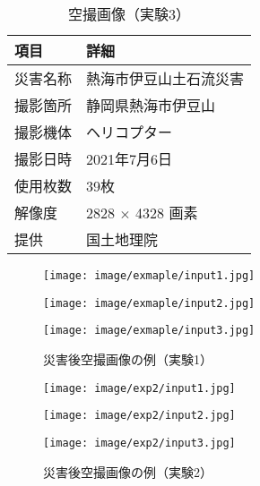       \begin{table}[tbp]
        \centering
        \caption{空撮画像（実験3）}
        \label{空撮画像（実験3）}
        \begin{tabular}{ll}
          \hline
          \textbf{項目} & \textbf{詳細} \\
          \hline \hline
          災害名称 & 熱海市伊豆山土石流災害 \\
          撮影箇所 & 静岡県熱海市伊豆山 \\
          撮影機体 & ヘリコプター \\
          撮影日時 & 2021年7月6日 \\
          使用枚数 & 39枚 \\
          解像度 & 2828 $\times$ 4328 画素 \\
          提供 & 国土地理院 \\ \hline
        \end{tabular}
      \end{table}

      \begin{figure}[tbp]
        \begin{minipage}[c]{0.329\hsize}
          \centering
          \texttt{[image: image/exmaple/input1.jpg]}
        \end{minipage}
        \begin{minipage}[c]{0.329\hsize}
          \centering
          \texttt{[image: image/exmaple/input2.jpg]}
        \end{minipage}
        \begin{minipage}[c]{0.329\hsize}
          \centering
          \texttt{[image: image/exmaple/input3.jpg]}
        \end{minipage}
        \caption{災害後空撮画像の例（実験1）}
        \label{空撮画像1}
      \end{figure}

      \begin{figure}[tbp]
        \begin{minipage}[c]{0.329\hsize}
          \centering
          \texttt{[image: image/exp2/input1.jpg]}
        \end{minipage}
        \begin{minipage}[c]{0.329\hsize}
          \centering
          \texttt{[image: image/exp2/input2.jpg]}
        \end{minipage}
        \begin{minipage}[c]{0.329\hsize}
          \centering
          \texttt{[image: image/exp2/input3.jpg]}
        \end{minipage}
        \caption{災害後空撮画像の例（実験2）}
        \label{空撮画像2}
      \end{figure}

